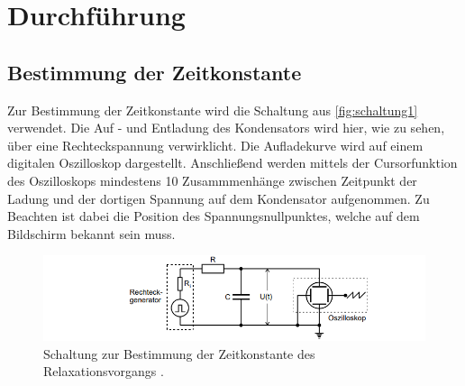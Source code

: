 \section{Durchführung}
\label{sec:Durchführung}
\subsection{Bestimmung der Zeitkonstante}
Zur Bestimmung der Zeitkonstante wird die Schaltung aus \autoref{fig:schaltung1} verwendet. Die Auf - und Entladung des Kondensators wird 
hier, wie zu sehen, über eine Rechteckspannung verwirklicht. Die Aufladekurve wird auf einem digitalen Oszilloskop dargestellt. Anschließend
werden mittels der Cursorfunktion des Oszilloskops mindestens 10 Zusammmenhänge zwischen Zeitpunkt der Ladung und der dortigen Spannung
auf dem Kondensator aufgenommen. Zu Beachten ist dabei die Position des Spannungsnullpunktes, welche auf dem Bildschirm bekannt sein muss.
\begin{figure}
    \centering
    \includegraphics[width=\textwidth]{content/schaltung1.png}
    \caption{Schaltung zur Bestimmung der Zeitkonstante des Relaxationsvorgangs \cite[281]{v353}.}
    \label{fig:schaltung1}
\end{figure}
